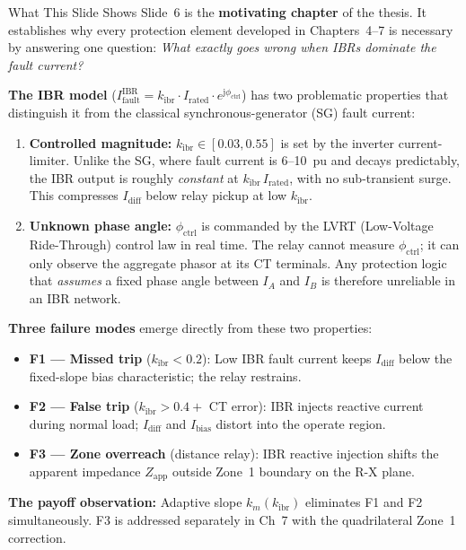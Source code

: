 \documentclass[12pt,a4paper]{article}
\newcommand{\kibr}{k_\mathrm{ibr}}
\newcommand{\Ifault}{I_\mathrm{fault}}
\newcommand{\Irated}{I_\mathrm{rated}}
\newcommand{\Idiff}{I_\mathrm{diff}}
\newcommand{\Ibias}{I_\mathrm{bias}}
\newcommand{\km}{k_m}
\newcommand{\Zapp}{Z_\mathrm{app}}
\newcommand{\phictrl}{\phi_\mathrm{ctrl}}
\newcommand{\jj}{\mathrm{j}}
\begin{document}
\begin{keybox}{What This Slide Shows}
Slide~6 is the \textbf{motivating chapter} of the thesis.  It establishes why every
protection element developed in Chapters~4--7 is necessary by answering one question:
\emph{What exactly goes wrong when IBRs dominate the fault current?}

\medskip
\textbf{The IBR model} ($\Ifault^\mathrm{IBR} = \kibr \cdot \Irated \cdot e^{\jj\phictrl}$)
has two problematic properties that distinguish it from the classical synchronous-generator
(SG) fault current:
\begin{enumerate}[nosep]
  \item \textbf{Controlled magnitude:} $\kibr \in [0.03, 0.55]$ is set by the inverter
        current-limiter.  Unlike the SG, where fault current is 6--10~pu and decays
        predictably, the IBR output is roughly \emph{constant} at $\kibr\,\Irated$, with
        no sub-transient surge.  This compresses $\Idiff$ below relay pickup at low $\kibr$.
  \item \textbf{Unknown phase angle:} $\phictrl$ is commanded by the LVRT (Low-Voltage
        Ride-Through) control law in real time.  The relay cannot measure $\phictrl$; it
        can only observe the aggregate phasor at its CT terminals.  Any protection logic
        that \emph{assumes} a fixed phase angle between $I_A$ and $I_B$ is therefore
        unreliable in an IBR network.
\end{enumerate}

\medskip
\textbf{Three failure modes} emerge directly from these two properties:
\begin{itemize}[nosep]
  \item \textbf{F1 --- Missed trip} ($\kibr < 0.2$): Low IBR fault current keeps
        $\Idiff$ below the fixed-slope bias characteristic; the relay restrains.
  \item \textbf{F2 --- False trip} ($\kibr > 0.4 +$ CT error): IBR injects reactive
        current during normal load; $\Idiff$ and $\Ibias$ distort into the operate region.
  \item \textbf{F3 --- Zone overreach} (distance relay): IBR reactive injection shifts
        the apparent impedance $\Zapp$ outside Zone~1 boundary on the R-X plane.
\end{itemize}

\medskip
\textbf{The payoff observation:} Adaptive slope $\km(\kibr)$ eliminates F1 and F2 simultaneously.
F3 is addressed separately in Ch~7 with the quadrilateral Zone~1 correction.
\end{keybox}
\end{document}
